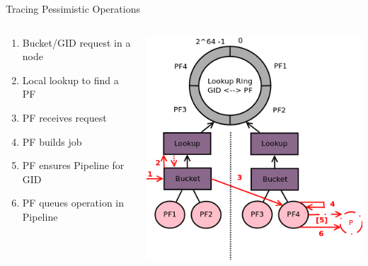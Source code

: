 \documentclass[aspectratio=43]{beamer}
\begin{document}
\begin{frame}{Tracing Pessimistic Operations}
    \begin{columns}
        \begin{column}[c]{0.5\textwidth}
            \begin{enumerate}
                \item Bucket/GID request in a node
                \item Local lookup to find a PF
                \item PF receives request
                \item PF builds job
                \item PF ensures Pipeline for GID
                \item PF queues operation in Pipeline
            \end{enumerate}
        \end{column}
        \begin{column}[c]{0.5\textwidth}
            \includegraphics[width=\textwidth]{images/tracingpessimistic.png}
        \end{column}
    \end{columns}
\end{frame}
\end{document}
